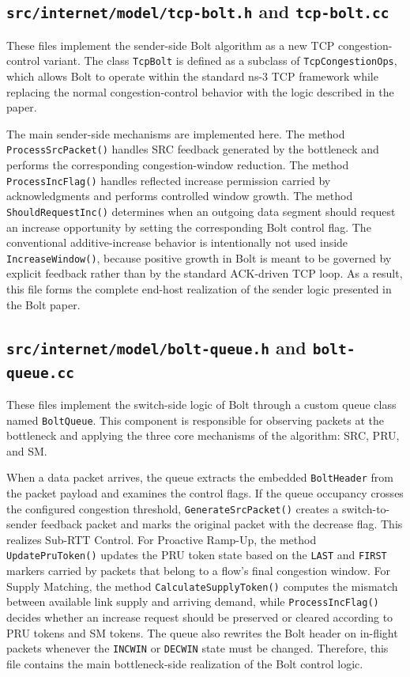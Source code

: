 \subsection{\texttt{src/internet/model/tcp-bolt.h} and \texttt{tcp-bolt.cc}}

These files implement the sender-side Bolt algorithm as a new TCP congestion-control variant. The class \texttt{TcpBolt} is defined as a subclass of \texttt{TcpCongestionOps}, which allows Bolt to operate within the standard ns-3 TCP framework while replacing the normal congestion-control behavior with the logic described in the paper.

The main sender-side mechanisms are implemented here. The method \texttt{ProcessSrcPacket()} handles SRC feedback generated by the bottleneck and performs the corresponding congestion-window reduction. The method \texttt{ProcessIncFlag()} handles reflected increase permission carried by acknowledgments and performs controlled window growth. The method \texttt{ShouldRequestInc()} determines when an outgoing data segment should request an increase opportunity by setting the corresponding Bolt control flag. The conventional additive-increase behavior is intentionally not used inside \texttt{IncreaseWindow()}, because positive growth in Bolt is meant to be governed by explicit feedback rather than by the standard ACK-driven TCP loop. As a result, this file forms the complete end-host realization of the sender logic presented in the Bolt paper.

\subsection{\texttt{src/internet/model/bolt-queue.h} and \texttt{bolt-queue.cc}}

These files implement the switch-side logic of Bolt through a custom queue class named \texttt{BoltQueue}. This component is responsible for observing packets at the bottleneck and applying the three core mechanisms of the algorithm: SRC, PRU, and SM.

When a data packet arrives, the queue extracts the embedded \texttt{BoltHeader} from the packet payload and examines the control flags. If the queue occupancy crosses the configured congestion threshold, \texttt{GenerateSrcPacket()} creates a switch-to-sender feedback packet and marks the original packet with the decrease flag. This realizes Sub-RTT Control. For Proactive Ramp-Up, the method \texttt{UpdatePruToken()} updates the PRU token state based on the \texttt{LAST} and \texttt{FIRST} markers carried by packets that belong to a flow's final congestion window. For Supply Matching, the method \texttt{CalculateSupplyToken()} computes the mismatch between available link supply and arriving demand, while \texttt{ProcessIncFlag()} decides whether an increase request should be preserved or cleared according to PRU tokens and SM tokens. The queue also rewrites the Bolt header on in-flight packets whenever the \texttt{INCWIN} or \texttt{DECWIN} state must be changed. Therefore, this file contains the main bottleneck-side realization of the Bolt control logic.

